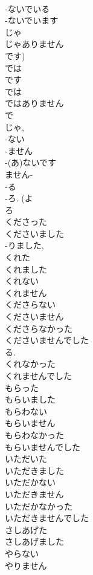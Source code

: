 \documentclass[8pt]{extreport}
\begin{document}
\begin{CJK}{UTF8}{min}
\\	-ないでいる 
\\	-ないでいます			
\\	じゃ 
\\	じゃありません 
\\	です) 
\\	では	
\\	です 
\\	では 
\\	ではありません 
\\	で 
\\	じゃ, 
\\	-ない 
\\	-ません 
\\	-(あ)ないです
\\	ません-
\\	-る 
\\	-ろ. (よ 
\\	ろ 
\\	くださった
\\	くださいました 
\\	-りました, 
\\	くれた
\\	くれました
\\	くれない
\\	くれません
\\	くださらない
\\	くださいません
\\	くださらなかった
\\	くださいませんでした 
\\	る. 
\\	くれなかった
\\	くれませんでした
\\	もらった
\\	もらいました
\\	もらわない
\\	もらいません
\\	もらわなかった
\\	もらいませんでした
\\	いただいた
\\	いただきました
\\	いただかない
\\	いただきません
\\	いただかなかった
\\	いただきませんでした
\\	さしあげた
\\	さしあげました
\\	やらない
\\	やりません

\end{CJK}
\end{document}
